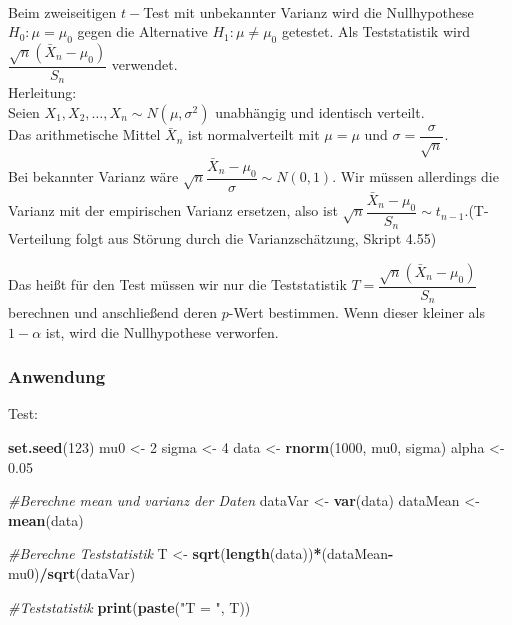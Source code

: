 \documentclass[]{article}
\newenvironment{Shaded}{\begin{snugshade}}{\end{snugshade}}
\newcommand{\CommentTok}[1]{\textcolor[rgb]{0.56,0.35,0.01}{\textit{#1}}}
\newcommand{\DecValTok}[1]{\textcolor[rgb]{0.00,0.00,0.81}{#1}}
\newcommand{\FloatTok}[1]{\textcolor[rgb]{0.00,0.00,0.81}{#1}}
\newcommand{\KeywordTok}[1]{\textcolor[rgb]{0.13,0.29,0.53}{\textbf{#1}}}
\newcommand{\NormalTok}[1]{#1}
\newcommand{\OperatorTok}[1]{\textcolor[rgb]{0.81,0.36,0.00}{\textbf{#1}}}
\newcommand{\StringTok}[1]{\textcolor[rgb]{0.31,0.60,0.02}{#1}}
\begin{document}
\citep{wikipediaT}\\
Beim zweiseitigen \(t-\)Test mit unbekannter Varianz wird die Nullhypothese \(H_0: \mu = \mu_0\) gegen die Alternative \(H_1: \mu \neq \mu_0\) getestet.
Als Teststatistik wird \(\dfrac{\sqrt{n}(\bar X_n-\mu_0)}{S_n}\) verwendet.\\
Herleitung:\\
Seien \(X_1, X_2, \dots, X_n\sim N(\mu, \sigma^2)\) unabhängig und identisch verteilt.\\
Das arithmetische Mittel \(\bar X_n\) ist normalverteilt mit \(\mu = \mu\) und \(\sigma = \dfrac{\sigma}{\sqrt{n}}\).\\
Bei bekannter Varianz wäre \(\sqrt{n}\dfrac{\bar X_n-\mu_0}{\sigma}\sim N(0,1)\).
Wir müssen allerdings die Varianz mit der empirischen Varianz ersetzen, also ist \(\sqrt{n}\dfrac{\bar X_n-\mu_0}{S_n}\sim t_{n-1}\).(T-Verteilung folgt aus Störung durch die Varianzschätzung, Skript 4.55)

Das heißt für den Test müssen wir nur die Teststatistik \(T=\dfrac{\sqrt{n}(\bar X_n-\mu_0)}{S_n}\) berechnen und anschließend deren \(p\)-Wert bestimmen. Wenn dieser kleiner als \(1-\alpha\) ist,
wird die Nullhypothese verworfen.

\hypertarget{anwendung-1}{%
\subsubsection{Anwendung}\label{anwendung-1}}

Test:

\begin{Shaded}
\begin{Highlighting}[]
\KeywordTok{set.seed}\NormalTok{(}\DecValTok{123}\NormalTok{)}
\NormalTok{mu0 <-}\StringTok{ }\DecValTok{2}
\NormalTok{sigma <-}\StringTok{ }\DecValTok{4}
\NormalTok{data <-}\StringTok{ }\KeywordTok{rnorm}\NormalTok{(}\DecValTok{1000}\NormalTok{, mu0, sigma)}
\NormalTok{alpha <-}\StringTok{ }\FloatTok{0.05}

\CommentTok{#Berechne mean und varianz der Daten}
\NormalTok{dataVar <-}\StringTok{ }\KeywordTok{var}\NormalTok{(data)}
\NormalTok{dataMean <-}\StringTok{ }\KeywordTok{mean}\NormalTok{(data)}

\CommentTok{#Berechne Teststatistik}
\NormalTok{T <-}\StringTok{ }\KeywordTok{sqrt}\NormalTok{(}\KeywordTok{length}\NormalTok{(data))}\OperatorTok{*}\NormalTok{(dataMean}\OperatorTok{-}\NormalTok{mu0)}\OperatorTok{/}\KeywordTok{sqrt}\NormalTok{(dataVar)}

\CommentTok{#Teststatistik}
\KeywordTok{print}\NormalTok{(}\KeywordTok{paste}\NormalTok{(}\StringTok{"T = "}\NormalTok{, T))}
\end{Highlighting}
\end{Shaded}
\end{document}
